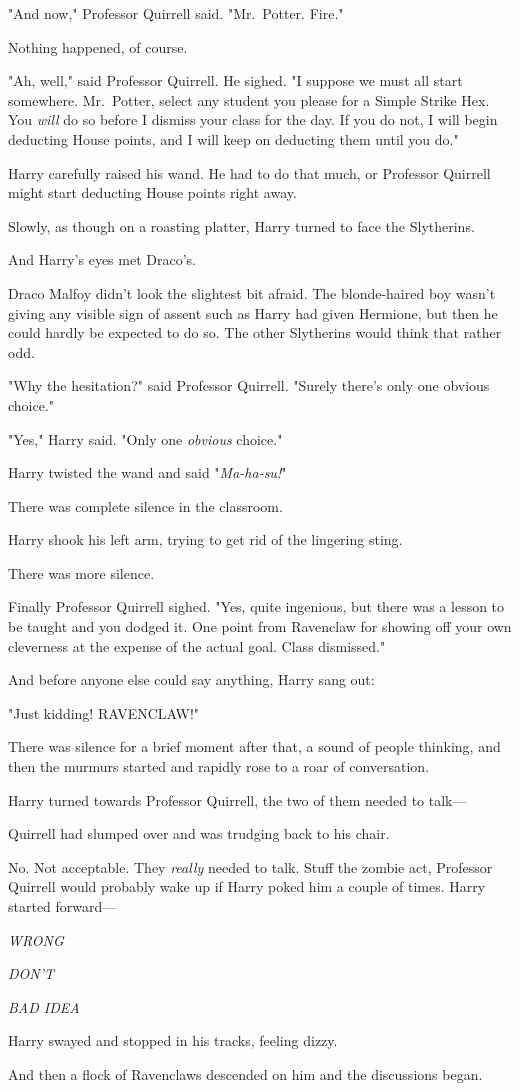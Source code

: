 "And now," Professor Quirrell said. "Mr.~Potter. Fire."

Nothing happened, of course.

"Ah, well," said Professor Quirrell. He sighed. "I suppose we must all start
somewhere. Mr.~Potter, select any student you please for a Simple Strike Hex.
You \emph{will} do so before I dismiss your class for the day. If you do not, I
will begin deducting House points, and I will keep on deducting them until you
do."

Harry carefully raised his wand. He had to do that much, or Professor Quirrell
might start deducting House points right away.

Slowly, as though on a roasting platter, Harry turned to face the Slytherins.

And Harry's eyes met Draco's.

Draco Malfoy didn't look the slightest bit afraid. The blonde-haired boy wasn't
giving any visible sign of assent such as Harry had given Hermione, but then he
could hardly be expected to do so. The other Slytherins would think that rather
odd.

"Why the hesitation?" said Professor Quirrell. "Surely there's only one obvious
choice."

"Yes," Harry said. "Only one \emph{obvious} choice."

Harry twisted the wand and said "\emph{Ma-ha-su!}"

There was complete silence in the classroom.

Harry shook his left arm, trying to get rid of the lingering sting.

There was more silence.

Finally Professor Quirrell sighed. "Yes, quite ingenious, but there was a
lesson to be taught and you dodged it. One point from Ravenclaw for showing off
your own cleverness at the expense of the actual goal. Class dismissed."

And before anyone else could say anything, Harry sang out:

"Just kidding! RAVENCLAW!"

There was silence for a brief moment after that, a sound of people thinking,
and then the murmurs started and rapidly rose to a roar of conversation.

Harry turned towards Professor Quirrell, the two of them needed to talk—

Quirrell had slumped over and was trudging back to his chair.

No. Not acceptable. They \emph{really} needed to talk. Stuff the zombie act,
Professor Quirrell would probably wake up if Harry poked him a couple of times.
Harry started forward—

\emph{WRONG}

\emph{DON'T}

\emph{BAD IDEA}

Harry swayed and stopped in his tracks, feeling dizzy.

And then a flock of Ravenclaws descended on him and the discussions began.
